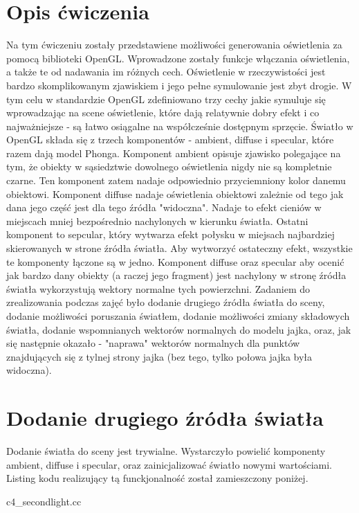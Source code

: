 \documentclass[polish,polish,a4paper]{report}
\begin{document}
\section{Opis ćwiczenia}
\par Na tym ćwiczeniu zostały przedstawiene możliwości generowania oświetlenia za pomocą biblioteki OpenGL.
Wprowadzone zostały funkcje włączania oświetlenia, a także te od nadawania im różnych cech.
Oświetlenie w rzeczywistości jest bardzo skomplikowanym zjawiskiem i jego pełne symulowanie jest zbyt drogie.
W tym celu w standardzie OpenGL zdefiniowano trzy cechy jakie symuluje się wprowadzając na scene oświetlenie, które dają relatywnie dobry efekt
i co najważniejsze - są łatwo osiągalne na współcześnie dostępnym sprzęcie.
Światło w OpenGL składa się z trzech komponentów - ambient, diffuse i specular, które razem dają model Phonga.
Komponent ambient opisuje zjawisko polegające na tym, że obiekty w sąsiedztwie dowolnego oświetlenia nigdy nie są kompletnie czarne.
Ten komponent zatem nadaje odpowiednio przyciemniony kolor danemu obiektowi.
Komponent diffuse nadaje oświetlenia obiektowi zależnie od tego jak dana jego część jest dla tego źródła "widoczna".
Nadaje to efekt cieniów w miejscach mniej bezpośrednio nachylonych w kierunku światła.
Ostatni komponent to sepcular, który wytwarza efekt połysku w miejsach najbardziej skierowanych w strone źródła światła.
Aby wytworzyć ostateczny efekt, wszystkie te komponenty łączone są w jedno.
Komponent diffuse oraz specular aby ocenić jak bardzo dany obiekty (a raczej jego fragment) jest nachylony w stronę źródła światła wykorzystują
wektory normalne tych powierzchni.
Zadaniem do zrealizowania podczas zajęć było dodanie drugiego źródła światła do sceny, dodanie możliwości poruszania światłem, dodanie możliwości
zmiany składowych światła, dodanie wspomnianych wektorów normalnych do modelu jajka, oraz, jak się następnie okazało - "naprawa" wektorów normalnych
dla punktów znajdujących się z tylnej strony jajka (bez tego, tylko połowa jajka była widoczna).

\pagebreak
\section{Dodanie drugiego źródła światła}
Dodanie światła do sceny jest trywialne. Wystarczyło powielić komponenty ambient, diffuse i specular, oraz zainicjalizować światło nowymi wartościami.
Listing kodu realizujący tą funckjonalność został zamieszczony poniżej.


{c4_secondlight.cc}
\end{document}
